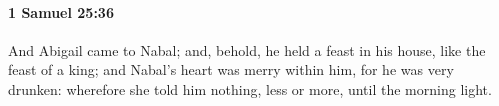 
		\paragraph{1 Samuel 25:36} %
			\label{1SAMUEL-25-36}

			And Abigail came to Nabal; and, behold, he held a feast in his house, like the feast of a king; and Nabal’s heart was merry within him, for he was very drunken: wherefore she told him nothing, less or more, until the morning light.


